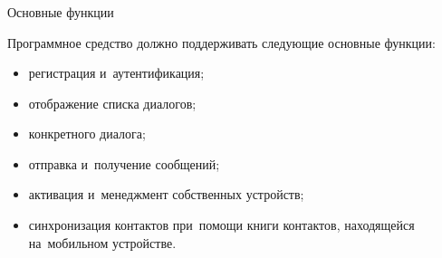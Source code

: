 \subsubsection{} Основные функции
\label{sec:analysis:research:req:functions}

Программное средство должно поддерживать следующие основные фун\-к\-ции:

\begin{itemize}
	\item регистрация и~аутентификация;
	\item отображение списка диалогов;
	\item конкретного диалога;
	\item отправка и~получение сообщений;
	\item активация и~менеджмент собственных устройств;
	\item синхронизация контактов при~помощи книги контактов, находящейся на~мобильном устройстве.
\end{itemize}